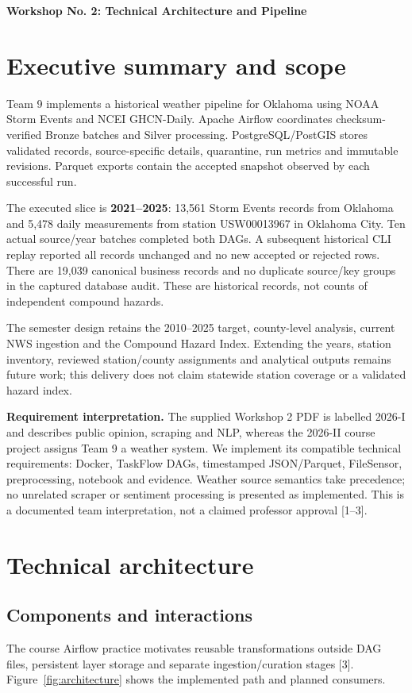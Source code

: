 \documentclass[10pt]{article}
\begin{document}

{\Large\bfseries Workshop No. 2: Technical Architecture and Pipeline}
\section{Executive summary and scope}
Team 9 implements a historical weather pipeline for Oklahoma using NOAA Storm
Events and NCEI GHCN-Daily. Apache Airflow coordinates checksum-verified Bronze
batches and Silver processing. PostgreSQL/PostGIS stores validated records,
source-specific details, quarantine, run metrics and immutable revisions.
Parquet exports contain the accepted snapshot observed by each successful run.

The executed slice is \textbf{2021--2025}: 13,561 Storm Events records from
Oklahoma and 5,478 daily measurements from station USW00013967 in Oklahoma City.
Ten actual source/year batches completed both DAGs. A subsequent historical CLI
replay reported all records unchanged and no new accepted or rejected rows.
There are 19,039 canonical business records and no duplicate source/key groups
in the captured database audit. These are historical records, not counts of
independent compound hazards.

The semester design retains the 2010--2025 target, county-level analysis, current
NWS ingestion and the Compound Hazard Index. Extending the years, station
inventory, reviewed station/county assignments and analytical outputs remains
future work; this delivery does not claim statewide station coverage or a
validated hazard index.

\textbf{Requirement interpretation.} The supplied Workshop 2 PDF is labelled
2026-I and describes public opinion, scraping and NLP, whereas the 2026-II course
project assigns Team 9 a weather system. We implement its compatible technical
requirements: Docker, TaskFlow DAGs, timestamped JSON/Parquet, FileSensor,
preprocessing, notebook and evidence. Weather source semantics take precedence;
no unrelated scraper or sentiment processing is presented as implemented.
This is a documented team interpretation, not a claimed professor approval
[1--3].

\section{Technical architecture}
\subsection{Components and interactions}
The course Airflow practice motivates reusable transformations outside DAG files,
persistent layer storage and separate ingestion/curation stages [3].
Figure~\ref{fig:architecture} shows the implemented path and planned consumers.
\end{document}

